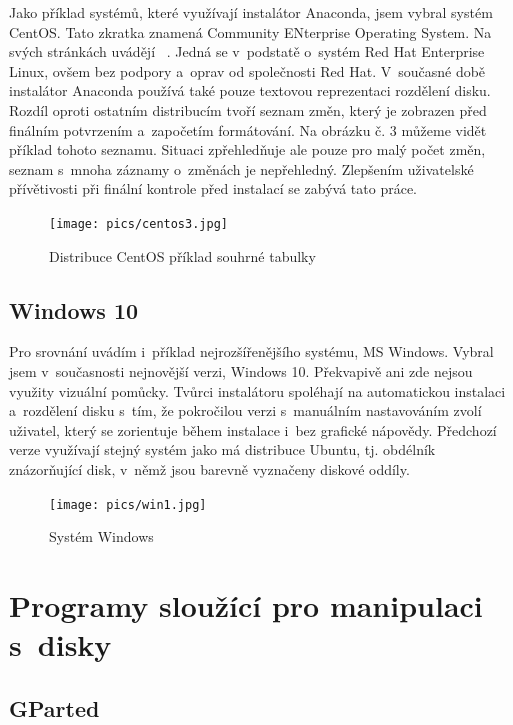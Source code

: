 \documentclass[color,table,oneside,nolot,nolof]{fithesis}
\begin{document}
Jako příklad systémů, které využívají instalátor Anaconda, jsem vybral systém CentOS. Tato zkratka znamená Community ENterprise Operating System. Na svých stránkách uvádějí ~\cite{CentOS}. Jedná se v~podstatě o~systém Red Hat Enterprise 
Linux, ovšem bez podpory a~oprav od společnosti Red Hat. V~současné době instalátor Anaconda používá také pouze textovou reprezentaci rozdělení disku. Rozdíl oproti ostatním distribucím tvoří 
seznam změn, který je zobrazen před finálním potvrzením a~započetím formátování. Na obrázku č. 3 můžeme vidět příklad tohoto seznamu. Situaci zpřehledňuje ale pouze pro malý počet změn, seznam s~mnoha 
záznamy o~změnách je nepřehledný. Zlepšením uživatelské přívětivosti při finální kontrole před instalací se zabývá tato práce.

\begin{figure}[h]
	\label{fig:centos2}
	\caption{Distribuce CentOS příklad souhrné tabulky}
	\centering
	\texttt{[image: pics/centos3.jpg]}
\end{figure}

\subsection{Windows 10}

Pro srovnání uvádím i~příklad nejrozšířenějšího systému, MS Windows. Vybral jsem v~současnosti nejnovější verzi, Windows 10. Překvapivě ani zde nejsou využity vizuální pomůcky.
Tvůrci instalátoru spoléhají na automatickou instalaci a~rozdělení disku s~tím, že pokročilou verzi s~manuálním nastavováním zvolí uživatel, který se zorientuje během instalace i~bez grafické nápovědy. 
Předchozí verze využívají stejný systém jako má distribuce Ubuntu, tj. obdélník znázorňující disk, v~němž jsou barevně vyznačeny diskové oddíly.

\begin{figure}[h!]
	\label{fig:win}
	\caption{Systém Windows}
	\centering
	\texttt{[image: pics/win1.jpg]}
\end{figure}

\section{Programy sloužící pro manipulaci s~disky}

\subsection{GParted}
\end{document}
